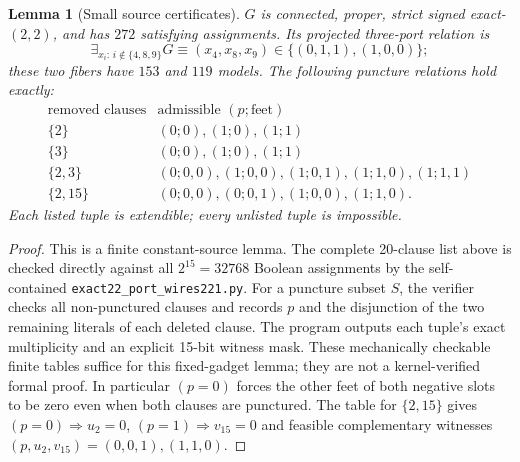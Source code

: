 \documentclass[11pt]{article}
\newtheorem{lemma}[theorem]{Lemma}
\begin{document}
\begin{lemma}[Small source certificates]
$G$ is connected, proper, strict signed exact-$(2,2)$, and has $272$ satisfying assignments. Its projected three-port relation is
\[
 \exists_{x_i:\,i\notin\{4,8,9\}}G
 \equiv (x_4,x_8,x_9)\in\{(0,1,1),(1,0,0)\};
\]
these two fibers have $153$ and $119$ models. The following puncture relations hold exactly:
\[
\begin{array}{c|l}
 \text{removed clauses}&\text{admissible }(p;\text{feet})\\\hline
 \{2\}&(0;0),(1;0),(1;1)\\
 \{3\}&(0;0),(1;0),(1;1)\\
 \{2,3\}&(0;0,0),(1;0,0),(1;0,1),(1;1,0),(1;1,1)\\
 \{2,15\}&(0;0,0),(0;0,1),(1;0,0),(1;1,0).
\end{array}
\]
Each listed tuple is extendible; every unlisted tuple is impossible.
\end{lemma}
\begin{proof}
This is a finite constant-source lemma. The complete 20-clause list above is checked directly against all $2^{15}=32768$ Boolean assignments by the self-contained \texttt{exact22\_port\_wires221.py}. For a puncture subset $S$, the verifier checks all non-punctured clauses and records $p$ and the disjunction of the two remaining literals of each deleted clause. The program outputs each tuple's exact multiplicity and an explicit 15-bit witness mask. These mechanically checkable finite tables suffice for this fixed-gadget lemma; they are not a kernel-verified formal proof. In particular $(p=0)$ forces the other feet of both negative slots to be zero even when both clauses are punctured. The table for $\{2,15\}$ gives $(p=0)\Rightarrow u_2=0$, $(p=1)\Rightarrow v_{15}=0$ and feasible complementary witnesses $(p,u_2,v_{15})=(0,0,1),(1,1,0)$.
\end{proof}
\end{document}

